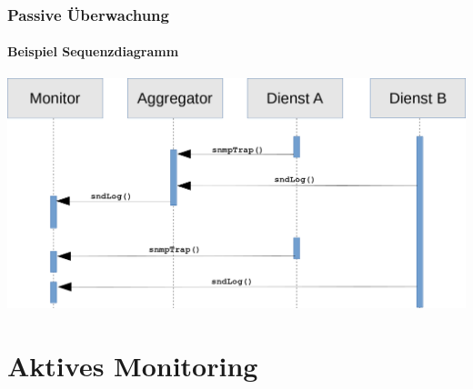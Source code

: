 \documentclass[10pt]{beamer} %
\begin{document}
\begin{frame}
\frametitle{Passive Überwachung}
\framesubtitle{Beispiel Sequenzdiagramm}

\includegraphics[scale=0.25]{img/sequence_uml_passive_trans.png}

\end{frame}

\section{Aktives Monitoring}

\end{document}
